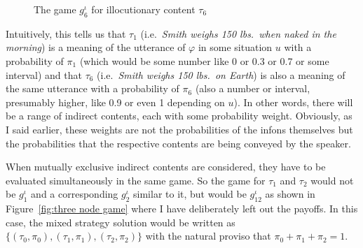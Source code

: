 \begin{figure}[h] 
 
\caption{The game $g^\iota_6$ for illocutionary content $\tau_6$}
\label{fig:ic6 game}
\end{figure}


Intuitively, this tells us that $\tau_1$ (i.e.\ \emph{Smith weighs 150 lbs.\ when naked in the morning}) is a meaning of the utterance of $\varphi$ in some situation $u$ with a probability of $\pi_1$ (which would be some number like 0 or 0.3 or 0.7 or some interval) and that $\tau_6$ (i.e.\ \emph{Smith weighs 150 lbs.\ on Earth}) is also a meaning of the same utterance with a probability of $\pi_6$ (also a number or interval, presumably higher, like 0.9 or even 1 depending on $u$). In other words, there will be a range of indirect contents, each with some probability weight. Obviously, as I said earlier, these weights are not the probabilities of the infons themselves but the probabilities that the respective contents are being conveyed by the speaker.

When mutually exclusive indirect contents are considered, they have to be evaluated simultaneously in the same game. So the game for $\tau_1$ and $\tau_2$ would not be $g^\iota_1$ and a corresponding $g^\iota_2$ similar to it, but would be $g^\iota_{12}$ as shown in Figure~\ref{fig:three node game} where I have deliberately left out the payoffs. In this case, the mixed strategy solution would be written as $\{(\tau_0, \pi_0), (\tau_1, \pi_1), (\tau_2, \pi_2)\}$ with the natural proviso that $\pi_0 + \pi_1 + \pi_2 = 1$.


